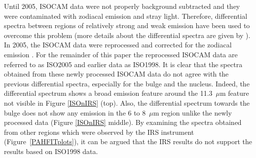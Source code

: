 Until 2005, ISOCAM data were not properly background subtracted and they were contaminated with zodiacal emission and stray light. 
Therefore, differential spectra between regions of relatively strong and weak emission have been used to overcome this problem 
(more details about the differential spectra are given by \citealt{1998Cesarsky}). In 2005, the ISOCAM data were reprocessed 
and corrected for the zodiacal emission \citep{Boulanger_F_2005}. For the remainder of this paper the reprocessed ISOCAM data are 
referred to as ISO2005 and earlier data as ISO1998. It is clear that the spectra obtained from these newly processed ISOCAM data 
do not agree with the previous differential spectra, especially for the bulge and the nucleus. Indeed, the differential spectrum shows a broad emission feature
around the 11.3~$\mu$m feature not visible in Figure \ref{ISOnIRS} (top). Also, the differential spectrum towards the bulge does not show 
any emission in the 6 to 8~$\mu$m region unlike the newly processed data (Figure \ref{ISOnIRS} middle).
By examining the spectra obtained from other regions  which were observed by the IRS instrument (Figure~\ref{PAHFITplots}), it can be argued that the IRS results do not support the results based on ISO1998 data.




